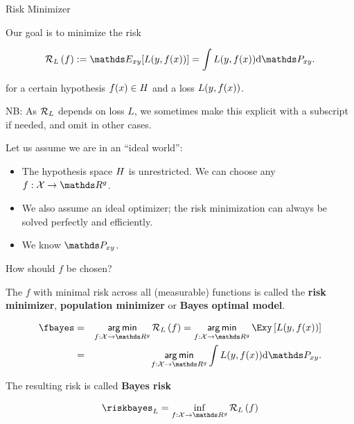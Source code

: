 \begin{vbframe}{Risk Minimizer}

Our goal is to minimize the risk

$$ \risk_L\left(f\right) := \E_{xy} [\Lxy] = \int \Lxy \text{d}\Pxy. $$

for a certain hypothesis $f(x) \in H$ and a loss $L(y, f(x))$. 

{\tiny NB: As $\mathcal{R}_L$ depends on loss $L$, we sometimes 
make this explicit with a subscript if needed, and omit in other cases.}

\lz 

Let us assume we are in an \enquote{ideal world}: 

\begin{itemize}
	\item The hypothesis space $H$ is unrestricted. We can choose any $f: \Xspace \to \R^g$. 
	\item We also assume an ideal optimizer; the risk minimization can always be 
        solved perfectly and efficiently.
	\item We know $\Pxy$. 
\end{itemize}

How should $f$ be chosen? 


\framebreak 

The $f$ with minimal risk across all (measurable) functions 
is called the \textbf{risk minimizer}, \textbf{population minimizer} or \textbf{Bayes optimal model}. 

\begin{eqnarray*}
	\fbayes &=& \argmin_{f: \Xspace \to \R^g} \risk_L\left(f\right) = \argmin_{f: \Xspace \to \R^g}\Exy\left[\Lxy\right]\\ &=&  \argmin_{f: \Xspace \to \R^g}\int \Lxy \text{d}\Pxy. 
\end{eqnarray*}


\lz 

The resulting risk is called \textbf{Bayes risk}

\begin{eqnarray*}
    \riskbayes_{L} = \inf_{f: \Xspace \to \R^g} \risk_L\left(f\right) 
\end{eqnarray*}


\end{vbframe}

